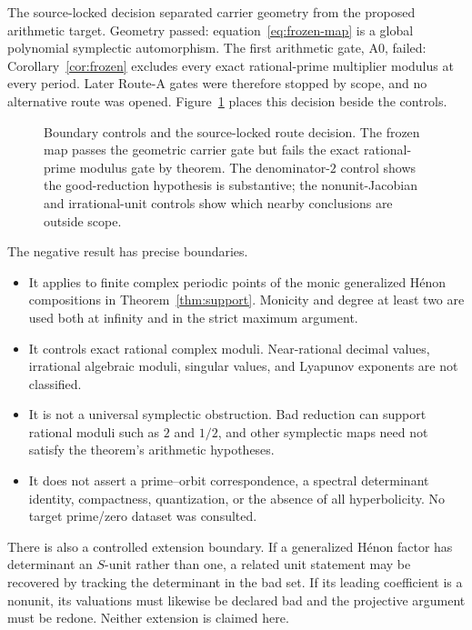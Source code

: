 \documentclass[11pt]{article}
\theoremstyle{definition}
\theoremstyle{remark}
\begin{document}
The source-locked decision separated carrier geometry from the proposed
arithmetic target.  Geometry passed: equation~\eqref{eq:frozen-map} is a global
polynomial symplectic automorphism.  The first arithmetic gate, A0, failed:
Corollary~\ref{cor:frozen} excludes every exact rational-prime multiplier
modulus at every period.  Later Route-A gates were therefore stopped by scope,
and no alternative route was opened.  Figure~\ref{fig:route} places this
decision beside the controls.

\begin{figure}[t]
  \centering
  \ScopeRouteDecisionFigure
  \caption{Boundary controls and the source-locked route decision.  The
  frozen map passes the geometric carrier gate but fails the exact
  rational-prime modulus gate by theorem.  The denominator-$2$ control shows
  the good-reduction hypothesis is substantive; the nonunit-Jacobian and
  irrational-unit controls show which nearby conclusions are outside scope.}
  \label{fig:route}
\end{figure}

The negative result has precise boundaries.
\begin{itemize}
  \item It applies to finite complex periodic points of the monic generalized
  H\'enon compositions in Theorem~\ref{thm:support}.  Monicity and degree at
  least two are used both at infinity and in the strict maximum argument.
  \item It controls exact rational complex moduli.  Near-rational decimal
  values, irrational algebraic moduli, singular values, and Lyapunov exponents
  are not classified.
  \item It is not a universal symplectic obstruction.  Bad reduction can
  support rational moduli such as $2$ and $1/2$, and other symplectic maps need
  not satisfy the theorem's arithmetic hypotheses.
  \item It does not assert a prime--orbit correspondence, a spectral
  determinant identity, compactness, quantization, or the absence of all
  hyperbolicity.  No target prime/zero dataset was consulted.
\end{itemize}

There is also a controlled extension boundary.  If a generalized H\'enon
factor has determinant an $S$-unit rather than one, a related unit statement
may be recovered by tracking the determinant in the bad set.  If its leading
coefficient is a nonunit, its valuations must likewise be declared bad and
the projective argument must be redone.  Neither extension is claimed here.
\end{document}
